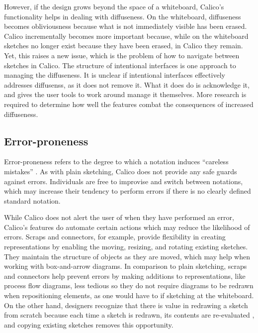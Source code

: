 \documentclass[12pt,fleqn]{ucithesis}
\begin{document}
However, if the design grows beyond the space of a whiteboard, Calico's functionality helps in dealing with diffuseness. On the whiteboard, diffuseness becomes obliviousness because what is not immediately visible has been erased. Calico incrementally becomes more important because, while on the whiteboard sketches no longer exist because they have been erased, in Calico they remain. Yet, this raises a new issue, which is the problem of how to navigate between sketches in Calico. The structure of intentional interfaces is one approach to managing the diffuseness. It is unclear if intentional interfaces effectively addresses diffusenss, as it does not remove it. What it does do is acknowledge it, and gives the user tools to work around manage it themselves. More research is required to determine how well the features combat the consequences of increased diffuseness.


\subsection{Error-proneness}

Error-proneness refers to the degree to which a notation induces ``careless mistakes'' \cite{Petre2013BookChapter}. As with plain sketching, Calico does not provide any safe guards against errors. Individuals are free to improvise and switch between notations, which may increase their tendency to perform errors if there is no clearly defined standard notation. 

While Calico does not alert the user of when they have performed an error, Calico's features do automate certain actions which may reduce the likelihood of errors. Scraps and connectors, for example, provide flexibility in creating representations by enabling the moving, resizing, and rotating existing sketches. They maintain the structure of objects as they are moved, which may help when working with box-and-arrow diagrams. In comparison to plain sketching, scraps and connectors help prevent errors by making additions to representations, like process flow diagrams, less tedious so they do not require diagrams to be redrawn when repositioning elements, as one would have to if sketching at the whiteboard. On the other hand, designers recognize that there is value in redrawing a sketch from scratch because each time a sketch is redrawn, its contents are re-evaluated \cite{petre2009insights}, and copying existing sketches removes this opportunity.
\end{document}
